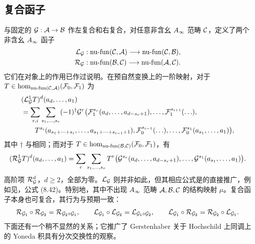 \subsection{复合函子}\label{sec:1e}
与固定的 $\mathcal G:\mathcal A\to\mathcal B$ 作左复合和右复合，对任意非含幺 $A_\infty$ 范畴 $\mathcal C$，定义了两个非含幺 $A_\infty$ 函子
\[
\begin{aligned}
\mathcal L_{\mathcal G}&:\operatorname{nu\text{-}fun}(\mathcal C,\mathcal A)\longrightarrow\operatorname{nu\text{-}fun}(\mathcal C,\mathcal B),\\
\mathcal R_{\mathcal G}&:\operatorname{nu\text{-}fun}(\mathcal B,\mathcal C)\longrightarrow\operatorname{nu\text{-}fun}(\mathcal A,\mathcal C).
\end{aligned}
\]
它们在对象上的作用已作过说明。在预自然变换上的一阶映射，对于 $T\in\hom_{\operatorname{nu\text{-}fun}(\mathcal C,\mathcal A)}(\mathcal F_0,\mathcal F_1)$ 为
\begin{equation}\label{eq:1.11}
\begin{aligned}
&(\mathcal L^1_{\mathcal G}T)^d(a_d,\ldots,a_1)\\
&=\sum_{r,i}\sum_{s_1,\ldots,s_r}(-1)^{\dagger}\mathcal G^r\bigl(
\mathcal F_1^{s_r}(a_d,\ldots,a_{d-s_r+1}),\ldots,\mathcal F_1^{s_{i+1}}(\ldots),\\
&\qquad T^{s_i}(a_{s_1+\cdots+s_i},\ldots,a_{s_1+\cdots+s_{i-1}+1}),
\mathcal F_0^{s_{i-1}}(\ldots),\ldots,\mathcal F_0^{s_1}(a_{s_1},\ldots,a_1)\bigr),
\end{aligned}
\end{equation}
其中 $\dagger$ 与相同；而对于 $T\in\hom_{\operatorname{nu\text{-}fun}(\mathcal B,\mathcal C)}(\mathcal F_0,\mathcal F_1)$，有
\[
\begin{aligned}
(\mathcal R^1_{\mathcal G}T)^d(a_d,\ldots,a_1)
=\sum_r\sum_{s_1,\ldots,s_r}T^r\bigl(\mathcal G^{s_r}(a_d,\ldots,a_{d-s_r+1}),\ldots,\mathcal G^{s_1}(a_{s_1},\ldots,a_1)\bigr).
\end{aligned}
\]
高阶项 $\mathcal R^d_{\mathcal G}$，$d\ge2$，全部为零。$\mathcal L_{\mathcal G}$ 则并非如此，但其相应公式是的直接推广，例如见，公式 (8.42)。特别地，其中不出现 $A_\infty$ 范畴 $\mathcal A,\mathcal B,\mathcal C$ 的结构映射 $\mu$。复合函子本身也可复合，其行为与预期一致：
\begin{equation}\label{eq:1.12}
\mathcal R_{\mathcal G_1}\circ\mathcal R_{\mathcal G_2}=\mathcal R_{\mathcal G_2\circ\mathcal G_1},\qquad
\mathcal L_{\mathcal G_1}\circ\mathcal L_{\mathcal G_2}=\mathcal L_{\mathcal G_1\circ\mathcal G_2},\qquad
\mathcal L_{\mathcal G_1}\circ\mathcal R_{\mathcal G_2}=\mathcal R_{\mathcal G_2}\circ\mathcal L_{\mathcal G_1}.
\end{equation}
下面还有一个稍不显然的关系；它推广了 Gerstenhaber 关于 Hochschild 上同调上的 Yoneda 积具有分次交换性的观察。

